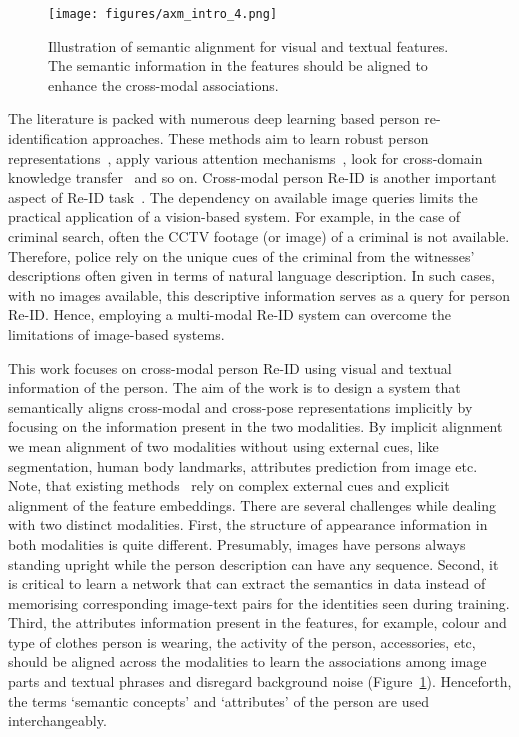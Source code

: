 \documentclass[letterpaper]{article} \usepackage{aaai22}  \usepackage{times}  \usepackage{helvet}  \usepackage{courier}  \usepackage[hyphens]{url}  \usepackage{graphicx} \urlstyle{rm} \def\UrlFont{\rm}  \usepackage{natbib}  \usepackage{caption} \DeclareCaptionStyle{ruled}{labelfont=normalfont,labelsep=colon,strut=off} \frenchspacing  \setlength{\pdfpagewidth}{8.5in}  \setlength{\pdfpageheight}{11in}  \usepackage{algorithm}
\begin{document}
 \begin{figure}
\centering
        \texttt{[image: figures/axm\_intro\_4.png]}
        \footnotesize{\caption{Illustration of semantic alignment for visual and textual features. The semantic information in the features should be aligned to enhance the cross-modal associations.}
    \label{axm_intro}}
\end{figure}
 
 The literature is packed with numerous deep learning based person re-identification approaches. These methods aim to learn robust person representations~\cite{zhou2019omni,dai2019batch}, apply various attention mechanisms~\cite{Xia_2019_ICCV,Chen_2019_ICCV}, look for cross-domain knowledge transfer~\cite{Jing_2020_CVPR,Chen_2019_ICCV_cross} and so on. Cross-modal person Re-ID is another important aspect of Re-ID task~\cite{yan2018person,farooq2020convolutional,farooq2020IJCB,Lu_2020_CVPR,Jing_2020_CVPR}. The dependency on available image queries limits the practical application of a vision-based system. For example, in the case of criminal search, often the CCTV footage (or image) of a criminal is not available. Therefore, police rely on the unique cues of the criminal from the witnesses’ descriptions often given in terms of natural language description. In such cases, with no images available, this descriptive information serves as a query for person Re-ID. Hence, employing a multi-modal Re-ID system can overcome the limitations of image-based systems. 
 
 This work focuses on cross-modal person Re-ID using visual and textual information of the person. The aim of the work is to design a system that semantically aligns cross-modal and cross-pose representations implicitly by focusing on the information present in the two modalities. By implicit alignment we mean alignment of two modalities without using external cues, like segmentation, human body landmarks, attributes prediction from image etc. Note, that existing methods~\cite{aggarwal2020text,wang2020vitaa,jing2018pose} rely on complex external cues and explicit alignment of the feature embeddings. 
 There are several challenges while dealing with two distinct modalities. First, the structure of appearance information in both modalities is quite different. Presumably, images have persons always standing upright while the person description can have any sequence. Second, it is critical to learn a network that can extract the semantics in data instead of memorising corresponding image-text pairs for the identities seen during training. Third, the attributes information present in the features, for example, colour and type of clothes person is wearing, the activity of the person, accessories, etc, should be aligned across the modalities to learn the associations among image parts and textual phrases and disregard background noise (Figure~\ref{axm_intro}). Henceforth, the terms `semantic concepts’ and  `attributes’ of the person are used interchangeably.
 
\end{document}
